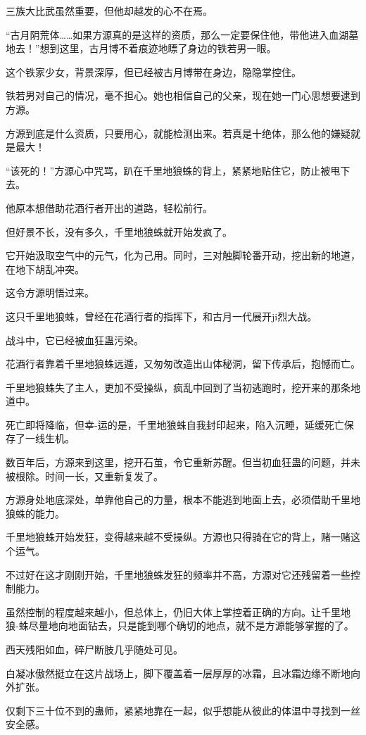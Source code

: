 \begin{this_body}
三族大比武虽然重要，但他却越发的心不在焉。

“古月阴荒体……如果方源真的是这样的资质，那么一定要保住他，带他进入血湖墓地去！”想到这里，古月博不着痕迹地瞟了身边的铁若男一眼。

这个铁家少女，背景深厚，但已经被古月博带在身边，隐隐掌控住。

铁若男对自己的情况，毫不担心。她也相信自己的父亲，现在她一门心思想要逮到方源。

方源到底是什么资质，只要用心，就能检测出来。若真是十绝体，那么他的嫌疑就是最大！

“该死的！”方源心中咒骂，趴在千里地狼蛛的背上，紧紧地贴住它，防止被甩下去。

他原本想借助花酒行者开出的道路，轻松前行。

但好景不长，没有多久，千里地狼蛛就开始发疯了。

它开始汲取空气中的元气，化为己用。同时，三对触脚轮番开动，挖出新的地道，在地下胡乱冲突。

这令方源明悟过来。

这只千里地狼蛛，曾经在花酒行者的指挥下，和古月一代展开ji烈大战。

战斗中，它已经被血狂蛊污染。

花酒行者靠着千里地狼蛛远遁，又匆匆改造出山体秘洞，留下传承后，抱憾而亡。

千里地狼蛛失了主人，更加不受操纵，疯乱中回到了当初逃跑时，挖开来的那条地道中。

死亡即将降临，但幸-运的是，千里地狼蛛自我封印起来，陷入沉睡，延缓死亡保存了一线生机。

数百年后，方源来到这里，挖开石茧，令它重新苏醒。但当初血狂蛊的问题，并未被根除。时间一长，又重新复发了。

方源身处地底深处，单靠他自己的力量，根本不能逃到地面上去，必须借助千里地狼蛛的能力。

千里地狼蛛开始发狂，变得越来越不受操纵。方源也只得骑在它的背上，赌一赌这个运气。

不过好在这才刚刚开始，千里地狼蛛发狂的频率并不高，方源对它还残留着一些控制能力。

虽然控制的程度越来越小，但总体上，仍旧大体上掌控着正确的方向。让千里地狼-蛛尽量地向地面钻去，只是能到哪个确切的地点，就不是方源能够掌握的了。

西天残阳如血，碎尸断肢几乎随处可见。

白凝冰傲然挺立在这片战场上，脚下覆盖着一层厚厚的冰霜，且冰霜边缘不断地向外扩张。

仅剩下三十位不到的蛊师，紧紧地靠在一起，似乎想能从彼此的体温中寻找到一丝安全感。


\end{this_body}
